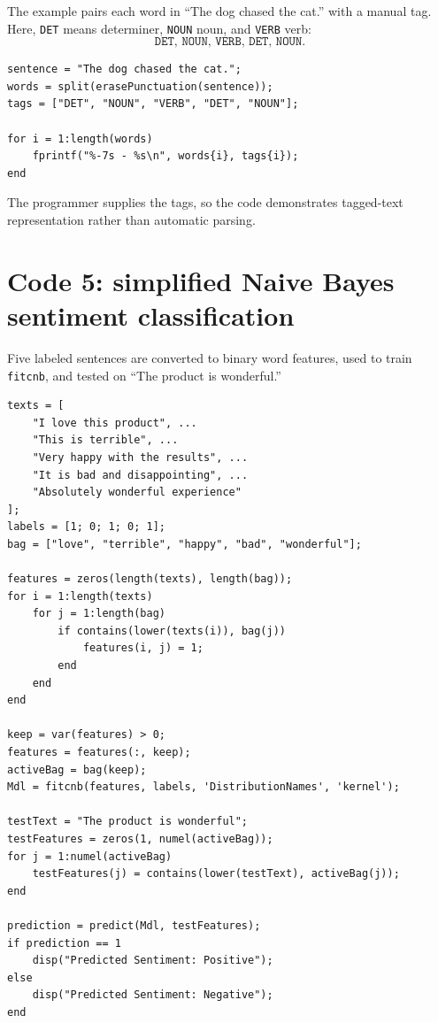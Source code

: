 The example pairs each word in ``The dog chased the cat.'' with a manual tag. Here, \texttt{DET} means determiner, \texttt{NOUN} noun, and \texttt{VERB} verb:
\[
\texttt{DET, NOUN, VERB, DET, NOUN}.
\]

\begin{lstlisting}[style=mlmatlab]
sentence = "The dog chased the cat.";
words = split(erasePunctuation(sentence));
tags = ["DET", "NOUN", "VERB", "DET", "NOUN"];

for i = 1:length(words)
    fprintf("%-7s - %s\n", words{i}, tags{i});
end
\end{lstlisting}

\begin{intuition}
The programmer supplies the tags, so the code demonstrates tagged-text representation rather than automatic parsing.
\end{intuition}

\section{Code 5: simplified Naive Bayes sentiment classification}

Five labeled sentences are converted to binary word features, used to train \texttt{fitcnb}, and tested on ``The product is wonderful.''

\begin{lstlisting}[style=mlmatlab]
texts = [
    "I love this product", ...
    "This is terrible", ...
    "Very happy with the results", ...
    "It is bad and disappointing", ...
    "Absolutely wonderful experience"
];
labels = [1; 0; 1; 0; 1];
bag = ["love", "terrible", "happy", "bad", "wonderful"];

features = zeros(length(texts), length(bag));
for i = 1:length(texts)
    for j = 1:length(bag)
        if contains(lower(texts(i)), bag(j))
            features(i, j) = 1;
        end
    end
end

keep = var(features) > 0;
features = features(:, keep);
activeBag = bag(keep);
Mdl = fitcnb(features, labels, 'DistributionNames', 'kernel');

testText = "The product is wonderful";
testFeatures = zeros(1, numel(activeBag));
for j = 1:numel(activeBag)
    testFeatures(j) = contains(lower(testText), activeBag(j));
end

prediction = predict(Mdl, testFeatures);
if prediction == 1
    disp("Predicted Sentiment: Positive");
else
    disp("Predicted Sentiment: Negative");
end
\end{lstlisting}

